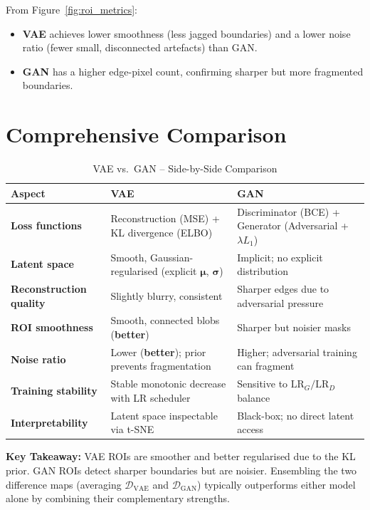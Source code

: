 \documentclass[12pt,a4paper]{article}
\begin{document}
From Figure~\ref{fig:roi_metrics}:
\begin{itemize}
    \item \textbf{VAE} achieves lower smoothness (less jagged boundaries) and a lower noise
          ratio (fewer small, disconnected artefacts) than GAN.
    \item \textbf{GAN} has a higher edge-pixel count, confirming sharper but more fragmented
          boundaries.
\end{itemize}

\section{Comprehensive Comparison}
\label{sec:comparison}

\begin{table}[H]
\centering
\renewcommand{\arraystretch}{1.45}
\caption{VAE vs.\ GAN -- Side-by-Side Comparison}
\label{tab:comparison}
\begin{tabularx}{\linewidth}{>{\bfseries}p{3.5cm} X X}
\toprule
\textbf{Aspect} & \textbf{VAE} & \textbf{GAN} \\
\midrule
Loss functions
  & Reconstruction (MSE) + KL divergence (ELBO)
  & Discriminator (BCE) + Generator (Adversarial + $\lambda L_1$) \\
Latent space
  & Smooth, Gaussian-regularised (explicit $\boldsymbol{\mu}$, $\boldsymbol{\sigma}$)
  & Implicit; no explicit distribution \\
Reconstruction quality
  & Slightly blurry, consistent
  & Sharper edges due to adversarial pressure \\
ROI smoothness
  & Smooth, connected blobs (\textbf{better})
  & Sharper but noisier masks \\
Noise ratio
  & Lower (\textbf{better}); prior prevents fragmentation
  & Higher; adversarial training can fragment \\
Training stability
  & Stable monotonic decrease with LR scheduler
  & Sensitive to $\text{LR}_G / \text{LR}_D$ balance \\
Interpretability
  & Latent space inspectable via t-SNE
  & Black-box; no direct latent access \\
\bottomrule
\end{tabularx}
\end{table}

\begin{keybox}
\textbf{Key Takeaway:} VAE ROIs are smoother and better regularised due to the KL prior.
GAN ROIs detect sharper boundaries but are noisier.  Ensembling the two difference maps
(averaging $\mathcal{D}_{\mathrm{VAE}}$ and $\mathcal{D}_{\mathrm{GAN}}$) typically
outperforms either model alone by combining their complementary strengths.
\end{keybox}
\end{document}
